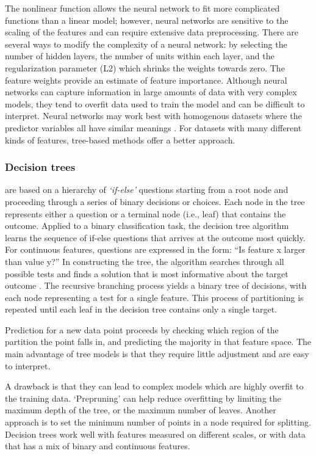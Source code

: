 The nonlinear function allows the neural 
network to fit more complicated functions than a linear model; however, 
neural networks are sensitive to the scaling of the features and can require
extensive data preprocessing. There are several ways to modify the complexity 
of a neural network: by selecting the number of hidden layers, the number of 
units within each layer, and the regularization parameter (L2) which shrinks 
the weights towards zero. The feature weights provide an estimate of feature 
importance. Although neural networks can capture information in large amounts 
of data with very complex models, they tend to overfit data used to train the 
model and can be difficult to interpret. Neural networks may work best with 
homogenous datasets where the predictor variables all have similar meanings 
\cite{muhuri13}. For datasets with many different kinds of features, 
tree-based methods offer a better approach.


\subsubsection{Decision trees} are based on a hierarchy of \emph{`if-else'}
questions starting from a root node and proceeding through a series of binary 
decisions or choices. Each node in the tree represents either 
a question or a terminal node (i.e., leaf) that contains the outcome. Applied to 
a binary classification task, the decision tree algorithm learns the sequence
of if-else questions that arrives at the outcome most quickly. For continuous 
features, questions are expressed in the form: ``Is feature x larger than 
value y?'' In constructing the tree, the algorithm searches through all 
possible tests and finds a solution that is most informative about the target 
outcome \cite{muller17}. The recursive branching process yields a binary tree 
of decisions, with each node representing a test for a single feature. This 
process of partitioning is repeated until each leaf in the decision tree 
contains only a single target. 


Prediction for a new data point proceeds by 
checking which region of the partition the point falls in, and predicting the 
majority in that feature space. The main advantage of tree models is that they 
require little adjustment and are easy to interpret. 

A drawback is that they 
can lead to complex models which are highly overfit to the training data. 
`Prepruning' can help reduce overfitting by limiting the maximum depth of the 
tree, or the maximum number of leaves. Another approach is to set the minimum 
number of points in a node required for splitting. Decision trees work well 
with features measured on different scales, or with data that has a mix of 
binary and continuous features. 


